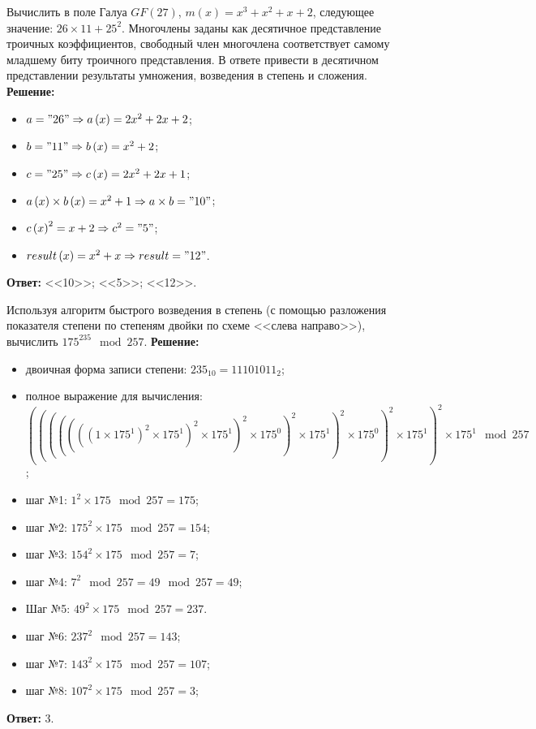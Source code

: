 \tasknumber Вычислить в поле Галуа $GF\left( 27 \right)$, $m\left( x \right) = x^{3} + x^{2} + x + 2$, следующее значение: $26 \times 11 + 25^2$. Многочлены заданы как десятичное представление троичных коэффициентов, свободный член многочлена соответствует самому младшему биту троичного представления. В ответе привести в десятичном представлении результаты умножения, возведения в степень и сложения.
\medbreak
\textbf{Решение:}
\begin{itemize}\itemsep1pt \parskip0pt 
	\item $a = "26" \Rightarrow a\left( x \right) = 2 x^{2} + 2 x + 2$;
	\item $b = "11" \Rightarrow b\left( x \right) = x^{2} + 2$;
	\item $c = "25" \Rightarrow c\left( x \right) = 2 x^{2} + 2 x + 1$;
	\item $a \left( x \right) \times b \left( x \right) = x^{2} + 1 \Rightarrow a \times b = "10"$;
	\item $c \left( x \right)^2 = x + 2 \Rightarrow c^2 = "5"$;
	\item $result\left( x \right) = x^{2} + x \Rightarrow result = "12"$.
\end{itemize}
\medbreak
\textbf{Ответ:} <<10>>; <<5>>; <<12>>.
\bigbreak

\tasknumber Используя алгоритм быстрого возведения в степень (с помощью разложения показателя степени по степеням двойки по схеме <<слева направо>>), вычислить ${175}^{235} \mod {257}$.
\medbreak
\textbf{Решение:}
\begin{itemize}\itemsep1pt \parskip0pt 
	\item двоичная форма записи степени: $235_{10} = 11101011_{2}$;
	\item полное выражение для вычисления: $(((((((1 \times {175}^1)^2 \times {175}^1)^2 \times {175}^1)^2 \times {175}^0)^2 \times {175}^1)^2 \times {175}^0)^2 \times {175}^1)^2 \times {175}^1\mod 257$;
	\item шаг №1: $1^2 \times 175 \mod 257  = 175$;
	\item шаг №2: $175^2 \times 175 \mod 257 = 154$;
	\item шаг №3: $154^2 \times 175 \mod 257 = 7$;
	\item шаг №4: $7^2 \mod 257 = 49 \mod 257 = 49$;
	\item Шаг №5: $49^2 \times 175 \mod 257 = 237$.
	\item шаг №6: $237^2 \mod 257 = 143$;
	\item шаг №7: $143^2 \times 175 \mod 257 = 107$;
	\item шаг №8: $107^2 \times 175 \mod 257 = 3$;
\end{itemize}
\medbreak
\textbf{Ответ:} 3.
\bigbreak

